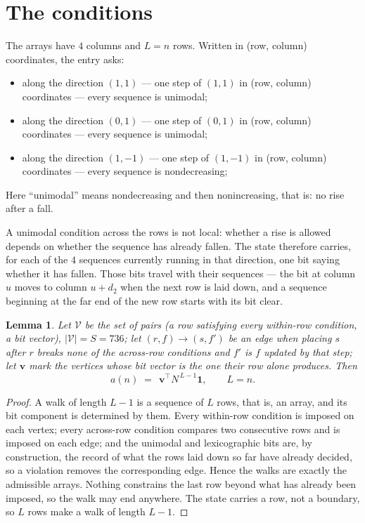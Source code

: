 \documentclass[11pt,a4paper]{article}
\theoremstyle{plain}
\newtheorem{lemma}[theorem]{Lemma}
\theoremstyle{definition}
\begin{document}
\section{The conditions}

The arrays have $4$ columns and $L=n$ rows. Written in (row, column)
coordinates, the entry asks:
\begin{itemize}
\item along the direction $(1,1)$ --- one step of $(1,1)$ in (row, column) coordinates --- every sequence is unimodal;
\item along the direction $(0,1)$ --- one step of $(0,1)$ in (row, column) coordinates --- every sequence is unimodal;
\item along the direction $(1,-1)$ --- one step of $(1,-1)$ in (row, column) coordinates --- every sequence is nondecreasing;
\end{itemize}
Here ``unimodal'' means nondecreasing and then nonincreasing, that is: no rise after a fall.

A unimodal condition across the rows is not local: whether a
rise is allowed depends on whether the sequence has already fallen. The state therefore
carries, for each of the $4$ sequences currently running in that direction, one bit saying
whether it has fallen. Those bits travel with their sequences --- the bit at column $u$
moves to column $u+d_2$ when the next row is laid down, and a sequence beginning at the
far end of the new row starts with its bit clear.

\begin{lemma}\label{lem:walk}
Let $\mathcal V$ be the set of pairs (a row satisfying every within-row condition, a
bit vector), $|\mathcal V|=S=736$; let $(r,f)\to(s,f')$ be an edge when placing $s$ after $r$
breaks none of the across-row conditions and $f'$ is $f$ updated by that step; let
$\mathbf{v}$ mark the vertices whose bit vector is the one their row alone produces.
Then
\[
a(n)\;=\;\,\mathbf{v}^{\!\top}N^{\,L-1}\mathbf{1},\qquad L=n.
\]
\end{lemma}

\begin{proof}
A walk of length $L-1$ is a sequence of $L$ rows, that is, an array, and its bit component
is determined by them. Every within-row condition is imposed on each vertex; every
across-row condition compares two consecutive rows and is imposed on each edge; and the
unimodal and lexicographic bits are, by construction, the record of what the rows laid down
so far have already decided, so a violation removes the corresponding edge. Hence the walks
are exactly the admissible arrays. Nothing constrains the last row beyond what has already
been imposed, so the walk may end anywhere. The state carries a row, not a boundary, so
$L$ rows make a walk of length $L-1$.
\end{proof}
\end{document}

